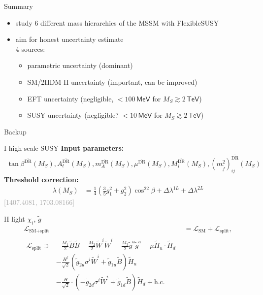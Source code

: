 \documentclass[hyperref={pdfpagelabels=false},ngerman]{beamer}
\newcommand{\eh}[1]{\,\mathsf{#1}}
\newcommand{\MS}{\ensuremath{M_S}}
\newcommand{\bigcite}[1]{\textcolor{darkgray}{[#1]}}
\renewcommand{\emph}{\textbf}
\newcommand{\DRbar}{\ensuremath{\overline{\text{DR}}}}
\newcommand{\SM}{\ensuremath{\text{SM}}}
\newcommand{\SplitMSSM}{\ensuremath{\text{SM+split}}\xspace}
\newcommand{\hc}{\ensuremath{\text{h.c.}}}
\newcommand{\Lag}{\ensuremath{\mathcal{L}}}
\newcommand{\DlHSSUSY}[1]{\ensuremath{\Delta\lambda^{#1L}}}
\newcommand{\gSplitMSSM}[1]{\ensuremath{\tilde{g}_{#1}}}
\begin{document}
\begin{frame}{Summary}
  \begin{itemize}
  \item study 6 different mass hierarchies of the MSSM with FlexibleSUSY
  \item aim for honest uncertainty estimate\\ 4 sources:
    \begin{itemize}
    \item parametric uncertainty (dominant)
    \item SM/2HDM-II uncertainty (important, can be improved)
    \item EFT uncertainty (negligible, $< 100\eh{MeV}$ for $\MS \gtrsim 2\eh{TeV}$)
    \item SUSY uncertainty (negligible? $< 10\eh{MeV}$ for $\MS \gtrsim 2\eh{TeV}$)
    \end{itemize}
  \end{itemize}
\end{frame}


\begin{frame}[noframenumbering]
  \begin{center}
    \Huge Backup
  \end{center}
\end{frame}

\begin{frame}[noframenumbering]{I high-scale SUSY}
  \emph{Input parameters:}
  \begin{align*}
  \tan\beta^{\DRbar}(\MS), A_t^{\DRbar}(\MS), m_A^{\DRbar}(\MS),
  \mu^{\DRbar}(\MS), M_i^{\DRbar}(\MS),
  (m_{\tilde{f}}^2)^{\DRbar}_{ij}(\MS)
  \end{align*}
  \emph{Threshold correction:}
  \begin{align*}
    \lambda(\MS) &= \frac{1}{4}\left(\frac{3}{5} g_1^2 +
                   g_2^2\right) \cos^22\beta + \DlHSSUSY{1} + \DlHSSUSY{2}
  \end{align*}
  \hfill\bigcite{1407.4081, 1703.08166}
\end{frame}

\begin{frame}[noframenumbering]{II light $\chi_i$, $\tilde{g}$}
\begin{align*}
  \Lag_{\SplitMSSM} &= \Lag_{\SM} + \Lag_\text{split}, \\
\begin{split}
  \Lag_\text{split} \supset
  &- \frac{M_1}{2} \tilde{B}\tilde{B}
  - \frac{M_2}{2} \tilde{W}^i\tilde{W}^i
  - \frac{M_3}{2} \tilde{g}^a\tilde{g}^a
  - \mu \tilde{H}_u\cdot \tilde{H}_d \\
  &-\frac{H^\dagger}{\sqrt{2}} \left(
    \gSplitMSSM{2u} \sigma^i\tilde{W}^i + \gSplitMSSM{1u} \tilde{B}
  \right)\tilde{H}_u \\
  &-\frac{H}{\sqrt{2}} \cdot  \left(
    -\gSplitMSSM{2d} \sigma^i\tilde{W}^i + \gSplitMSSM{1d} \tilde{B}
  \right) \tilde{H}_d
  + \hc
\end{split}
\end{align*}
\end{frame}
\end{document}
